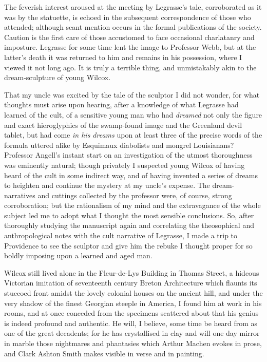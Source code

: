 \begin{pages}
\begin{Leftside}
The feverish interest aroused at the meeting by Legrasse's tale,
corroborated as it was by the statuette, is echoed in the subsequent
correspondence of those who attended; although scant mention occurs in
the formal publications of the society. Caution is the first care of
those accustomed to face occasional charlatanry and imposture. Legrasse
for some time lent the image to Professor Webb, but at the latter's
death it was returned to him and remains in his possession, where I
viewed it not long ago. It is truly a terrible thing, and unmistakably
akin to the dream-sculpture of young Wilcox.

That my uncle was excited by the tale of the sculptor I did not wonder,
for what thoughts must arise upon hearing, after a knowledge of what
Legrasse had learned of the cult, of a sensitive young man who had
\emph{dreamed} not only the figure and exact hieroglyphics of the swamp-found
image and the Greenland devil tablet, but had come \emph{in his dreams} upon at
least three of the precise words of the formula uttered alike by
Esquimaux diabolists and mongrel Louisianans? Professor Angell's instant
start on an investigation of the utmost thoroughness was eminently
natural; though privately I suspected young Wilcox of having heard of
the cult in some indirect way, and of having invented a series of dreams
to heighten and continue the mystery at my uncle's expense. The
dream-narratives and cuttings collected by the professor were, of
course, strong corroboration; but the rationalism of my mind and the
extravagance of the whole subject led me to adopt what I thought the
most sensible conclusions. So, after thoroughly studying the manuscript
again and correlating the theosophical and anthropological notes with
the cult narrative of Legrasse, I made a trip to Providence to see the
sculptor and give him the rebuke I thought proper for so boldly imposing
upon a learned and aged man.

Wilcox still lived alone in the Fleur-de-Lys Building in Thomas Street,
a hideous Victorian imitation of seventeenth century Breton Architecture
which flaunts its stuccoed front amidst the lovely colonial houses on
the ancient hill, and under the very shadow of the finest Georgian
steeple in America, I found him at work in his rooms, and at once
conceded from the specimens scattered about that his genius is indeed
profound and authentic. He will, I believe, some time be heard from as
one of the great decadents; for he has crystallised in clay and will one
day mirror in marble those nightmares and phantasies which Arthur Machen
evokes in prose, and Clark Ashton Smith makes visible in verse and in
painting.


\end{Leftside}
\end{pages}
